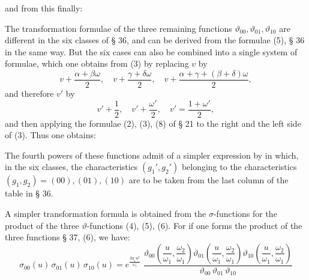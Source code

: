 and from this finally:

The transformation formulae of the three remaining functions $\vartheta_{00}, \vartheta_{01}, \vartheta_{10}$ are different in the six classes of § 36, and can be derived from the formulae (5), § 36 in the same way. But the six cases can also be combined into a single system of formulae, which one obtains from (3) by replacing $v$ by
\[
v+\frac{\alpha+\beta\omega}{2}, \quad v+\frac{\gamma+\delta\omega}{2}, \quad v+\frac{\alpha+\gamma+(\beta+\delta)\omega}{2},
\]
and therefore $v'$ by
\[
v'+\frac{1}{2}, \quad v'+\frac{\omega'}{2}, \quad v' = \frac{1+\omega'}{2},
\]
and then applying the formulae (2), (3), (8) of § 21 to the right and the left side of (3). Thus one obtains:

The fourth powers of these functions admit of a simpler expression by
in which, in the six classes, the characteristics $(g_1',g_2')$ belonging to the characteristics $(g_1,g_2)=(00),(01),(10)$ are to be taken from the last column of the table in § 36.

A simpler transformation formula is obtained from the $\sigma$-functions for the product of the three $\vartheta$-functions (4), (5), (6). For if one forms the product of the three functions § 37, (6), we have:
\[
\sigma_{00}(u)\,\sigma_{01}(u)\,\sigma_{10}(u)
= e^{\frac{3\eta_1 u^2}{\omega_1}}\; \frac{\vartheta_{00}\!\left(\dfrac{u}{\omega_1}, \dfrac{\omega_2}{\omega_1}\right)\vartheta_{01}\!\left(\dfrac{u}{\omega_1}, \dfrac{\omega_2}{\omega_1}\right)\vartheta_{10}\!\left(\dfrac{u}{\omega_1}, \dfrac{\omega_2}{\omega_1}\right)}{\vartheta_{00}\,\vartheta_{01}\,\vartheta_{10}}
\]
